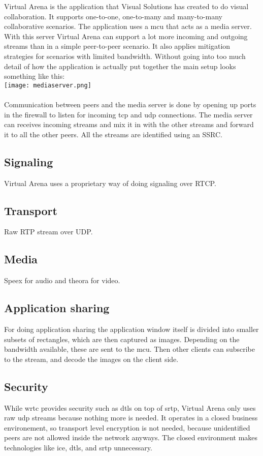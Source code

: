 Virtual Arena is the application that Visual Solutions has created to do visual collaboration\cite{VirtualArena}. It supports one-to-one, one-to-many and many-to-many collaborative scenarios. The application uses a \gls{mcu} that acts as a media server. With this server Virtual Arena can support a lot more incoming and outgoing streams than in a simple peer-to-peer scenario. It also applies mitigation strategies for scenarios with limited bandwidth. Without going into too much detail of how the application is actually put together the main setup looks something like this: 
\\
\texttt{[image: mediaserver.png]}
\\
\\
Communication between peers and the media server is done by opening up ports in the firewall to listen for incoming tcp and udp connections. The media server can receives incoming streams and mix it in with the other streams and forward it to all the other peers. All the streams are identified using an SSRC.

\subsection{Signaling}
Virtual Arena uses a proprietary way of doing signaling over RTCP.

\subsection{Transport}
Raw RTP stream over UDP.

\subsection{Media}
Speex for audio and theora for video.

\subsection{Application sharing}
For doing application sharing the application window itself is divided into smaller subsets of rectangles, which are then captured as images. Depending on the bandwidth available, these are sent to the \gls{mcu}. Then other clients can subscribe to the stream, and decode the images on the client side.

\subsection{Security}
While \gls{wrtc} provides security such as \gls{dtls} on top of \gls{srtp}, Virtual Arena only uses raw \gls{udp} streams because nothing more is needed. It operates in a closed business environement, so transport level encryption is not needed, because unidentified peers are not allowed inside the network anyways.  The closed environment makes technologies like \gls{ice}, \gls{dtls}, and {srtp} unnecessary.
